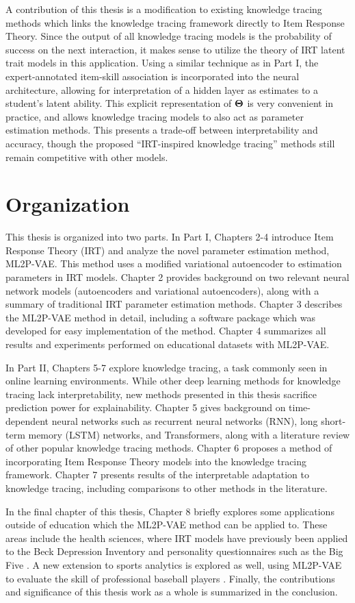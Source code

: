A contribution of this thesis is a modification to existing knowledge tracing methods which links the knowledge tracing framework directly to Item Response Theory. Since the output of all knowledge tracing models is the probability of success on the next interaction, it makes sense to utilize the theory of IRT latent trait models in this application. Using a similar technique as in Part I, the expert-annotated item-skill association is incorporated into the neural architecture, allowing for interpretation of a hidden layer as estimates to a student's latent ability. This explicit representation of $\boldsymbol{\Theta}$ is very convenient in practice, and allows knowledge tracing models to also act as parameter estimation methods. This presents a trade-off between interpretability and accuracy, though the proposed ``IRT-inspired knowledge tracing'' methods still remain competitive with other models.

\section{Organization}
This thesis is organized into two parts. In Part I, Chapters 2-4 introduce Item Response Theory (IRT) and analyze the novel parameter estimation method, ML2P-VAE. This method uses a modified variational autoencoder to estimation parameters in IRT models. Chapter 2 provides background on two relevant neural network models (autoencoders and variational autoencoders), along with a summary of traditional IRT parameter estimation methods. Chapter 3 describes the ML2P-VAE method in detail, including a software package which was developed for easy implementation of the method. Chapter 4 summarizes all results and experiments performed on educational datasets with ML2P-VAE.

In Part II, Chapters 5-7 explore knowledge tracing, a task commonly seen in online learning environments. While other deep learning methods for knowledge tracing lack interpretability, new methods presented in this thesis sacrifice prediction power for explainability. Chapter 5 gives background on time-dependent neural networks such as recurrent neural networks (RNN), long short-term memory (LSTM) networks, and Transformers, along with a literature review of other popular knowledge tracing methods. Chapter 6 proposes a method of incorporating Item Response Theory models into the knowledge tracing framework. Chapter 7 presents results of the interpretable adaptation to knowledge tracing, including comparisons to other methods in the literature.

In the final chapter of this thesis, Chapter 8 briefly explores some applications outside of education which the ML2P-VAE method can be applied to. These areas include the health sciences, where IRT models have previously been applied to the Beck Depression Inventory \cite{beck1996, fragoso2013, huang2015} and personality questionnaires such as the Big Five \cite{robie2001}. A new extension to sports analytics is explored as well, using ML2P-VAE to evaluate the skill of professional baseball players \cite{fsdm_paper}. Finally, the contributions and significance of this thesis work as a whole is summarized in the conclusion.

